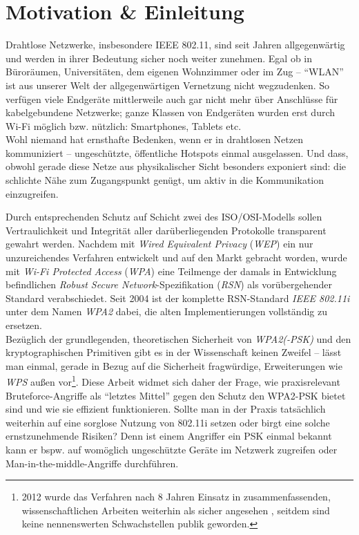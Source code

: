 \section{Motivation \& Einleitung}
Drahtlose Netzwerke, insbesondere IEEE 802.11, sind seit Jahren allgegenwärtig und werden in ihrer Bedeutung sicher noch weiter zunehmen. Egal ob in Büroräumen, Universitäten, dem eigenen Wohnzimmer oder im Zug -- \enquote{WLAN} ist aus unserer Welt der allgegenwärtigen Vernetzung nicht wegzudenken. 
So verfügen viele Endgeräte mittlerweile auch gar nicht mehr über Anschlüsse für kabelgebundene Netzwerke; ganze Klassen von Endgeräten wurden erst durch Wi-Fi möglich bzw. nützlich: Smartphones, Tablets etc.\\

Wohl niemand hat ernsthafte Bedenken, wenn er in drahtlosen Netzen kommuniziert -- ungeschützte, öffentliche Hotspots einmal ausgelassen. 
Und dass, obwohl gerade diese Netze aus physikalischer Sicht besonders exponiert sind: die schlichte Nähe zum Zugangspunkt genügt, um aktiv in die Kommunikation einzugreifen.

Durch entsprechenden Schutz auf Schicht zwei des ISO/OSI-Modells sollen Vertraulichkeit und Integrität aller darüberliegenden Protokolle transparent gewahrt werden.
Nachdem mit \textit{Wired Equivalent Privacy} (\textit{WEP}) ein nur unzureichendes Verfahren entwickelt und auf den Markt gebracht worden, wurde mit \textit{Wi-Fi Protected Access} (\textit{WPA}) eine Teilmenge der damals in Entwicklung befindlichen \textit{Robust Secure Network}-Spezifikation (\textit{RSN}) als vorübergehender Standard verabschiedet.
Seit 2004 ist der komplette RSN-Standard \textit{IEEE 802.11i} unter dem Namen \textit{WPA2} dabei, die alten Implementierungen vollständig zu ersetzen.\\

Bezüglich der grundlegenden, theoretischen Sicherheit von \textit{WPA2(-PSK)} und den kryptographischen Primitiven gibt es in der Wissenschaft keinen Zweifel -- lässt man einmal, gerade in Bezug auf die Sicherheit fragwürdige, Erweiterungen wie \textit{WPS} außen vor\footnote{2012 wurde das Verfahren nach 8 Jahren Einsatz in zusammenfassenden, wissenschaftlichen Arbeiten weiterhin als sicher angesehen \cite{kumkar2012}, seitdem sind keine nennenswerten Schwachstellen publik geworden.}.
Diese Arbeit widmet sich daher der Frage, wie praxisrelevant Bruteforce-Angriffe als \enquote{letztes Mittel} gegen den Schutz den WPA2-PSK bietet sind und wie sie effizient funktionieren.
Sollte man in der Praxis tatsächlich weiterhin auf eine sorglose Nutzung von 802.11i setzen oder birgt eine solche ernstzunehmende Risiken? Denn ist einem Angriffer ein PSK einmal bekannt kann er bspw. auf womöglich ungeschützte Geräte im Netzwerk zugreifen oder Man-in-the-middle-Angriffe durchführen.\\

